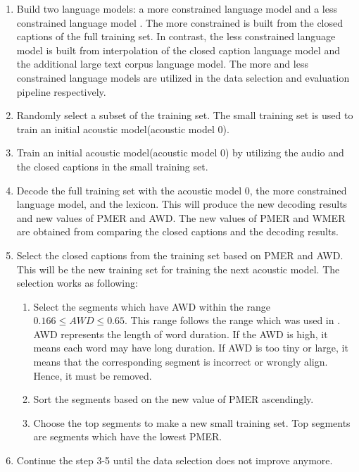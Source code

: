 \begin{enumerate}
\item Build two language models: a more constrained language model and a less constrained language model . The more constrained is built from the closed captions of the full training set. In contrast, the less constrained language model is built from interpolation of the closed caption language model and the additional large text corpus language model. The more and less constrained language models are utilized in the data selection and evaluation pipeline respectively.
\item Randomly select a subset of the training set. The small training set is used to train an initial acoustic model(acoustic model 0). 
\item Train an initial acoustic model(acoustic model 0) by utilizing the audio and the closed captions in the small training set. 
\item Decode the full training set with the acoustic model 0, the more constrained language model, and the lexicon. This will produce the new decoding results and new values of PMER and AWD.  The new values of PMER and WMER are obtained from comparing the closed captions and the decoding results. %

\item Select the closed captions from the training set based on PMER and AWD. This will be the new training set for training the next acoustic model. The selection works as following:
	\begin{enumerate}
	\item Select the segments which have AWD within the range $0.166 \le AWD \le 0.65$. This range follows the range which was used in \cite{Lanchantin2016}.  AWD represents the length of word duration. If the AWD is high, it means each word may have long duration.  If AWD is too tiny or large, it means that the corresponding segment is incorrect or wrongly align.  Hence, it must be removed.
	\item Sort the segments based on the new value of PMER ascendingly. 
	\item Choose the top segments to make a new small training set. Top segments are segments which have the lowest PMER.
	\end{enumerate}
\item Continue the step 3-5 until the data selection does not improve anymore. 
\end{enumerate}


